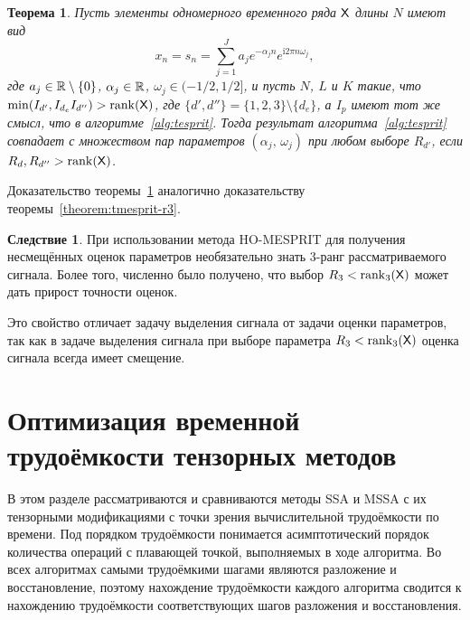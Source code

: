 \documentclass[specialist,
  substylefile = spbu.rtx,
subf,href,colorlinks=true, 12pt]{disser}
\theoremstyle{plain}
\newtheorem{theorem}{Теорема}[section]
\theoremstyle{definition}
\newtheorem*{corollary}{Следствие}
\theoremstyle{remark}
\newcommand{\iu}{\mathrm{i}}
\begin{document}
\begin{theorem}\label{theorem:tesprit-r3}
  Пусть элементы одномерного временного ряда $\mathsf{X}$ длины $N$ имеют вид
  \begin{equation*}
    x_n = s_n = \sum_{j=1}^{J} a_j e^{-\alpha_j n} e^{\iu
    2 \pi n \omega_j},
  \end{equation*}
  где $a_j \in \mathbb{R} \setminus \{0\}$, $\alpha_j \in \mathbb{R}$, $\omega_j
  \in (-1/2, 1/2]$,
  и пусть $N$, $L$ и $K$ такие, что $\min(I_{d'}, I_{d_e}
  I_{d''}) >
  \operatorname{rank}(\mathsf{X})$, где $\{d', d''\} = \{1, 2, 3\}\setminus\{d_e\}$,
  а $I_p$ имеют тот же смысл, что в алгоритме~\ref{alg:tesprit}.
  Тогда результат алгоритма~\ref{alg:tesprit} совпадает с множеством
  пар параметров $(\alpha_j,\,\omega_j)$ при любом выборе $R_{d'}$, если
  $R_d, R_{d''} > \operatorname{rank}(\mathsf{X})$.
\end{theorem}
Доказательство теоремы~\ref{theorem:tesprit-r3} аналогично
доказательству теоремы~\ref{theorem:tmesprit-r3}.

\begin{corollary}
  При использовании метода HO-MESPRIT для получения несмещённых
  оценок параметров необязательно знать 3-ранг рассматриваемого сигнала.
  Более того, численно было получено, что выбор $R_3 <
  \operatorname{rank}_3(\mathsf{X})$ может дать прирост точности оценок.

  Это свойство отличает задачу выделения сигнала от задачи оценки
  параметров, так как в задаче выделения сигнала при выборе параметра $R_3 <
  \operatorname{rank}_3(\mathsf{X})$ оценка сигнала всегда имеет смещение.
\end{corollary}

\section{Оптимизация временной трудоёмкости тензорных
методов}\label{sec:efficiency}
В этом разделе рассматриваются и сравниваются методы SSA и MSSA с их
тензорными модификациями с точки зрения вычислительной
трудоёмкости по времени. Под порядком трудоёмкости понимается
асимптотический порядок количества операций с плавающей точкой,
выполняемых в ходе алгоритма.
Во всех алгоритмах самыми трудоёмкими шагами являются разложение и
восстановление, поэтому нахождение трудоёмкости каждого алгоритма
сводится к нахождению трудоёмкости соответствующих шагов разложения и
восстановления.
\end{document}

